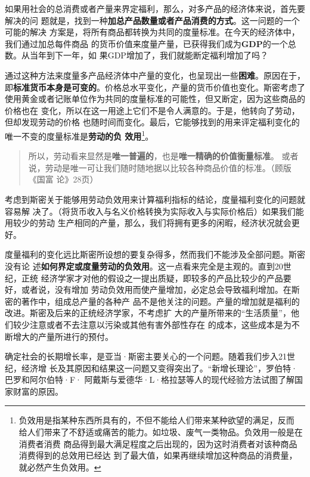 如果用社会的总消费或者产量来界定福利，那么，对多产品的经济体来说，首先要解决的问
题就是，找到一种\textbf{加总产品数量或者产品消费的方式}。这一问题的一个可能的解决
方案是，将所有商品都转换为共同的度量标准。在今天的经济体中，我们通过加总每件商品
的货币价值来度量产量，已获得我们成为\textbf{GDP}的一个总数。从当年到下一年，如
果GDP增加了，我们就能断定福利增加了吗？

通过这种方法来度量多产品经济体中产量的变化，也呈现出一些\textbf{困难}。原因在于，
即\textbf{标准货币本身是可变的}。价格总水平变化，产量的货币价值也变化。斯密考虑了
使用黄金或者记账单位作为共同的度量标准的可能性，但又断定，因为这些商品的价格也在
变化，所以在这一用途上它们不是令人满意的。于是，他转向了劳动，但却发现劳动的价格
也随时间而变化。最后，它能够找到的用来评定福利变化的唯一不变的度量标准是\textbf{劳动的负
效用}\footnote{负效用是指某种东西所具有的，不但不能给人们带来某种欲望的满足，反而
  给人们带来了不舒适或痛苦的能力。如垃圾、废气一类物品。负效用一般是在消费者消费
  商品得到最大满足程度之后出现的，因为这时消费者对该种商品消费得到的总效用已经达
  到了最大值，如果再继续增加这种商品的消费量，就必然产生负效用。}。

\begin{quotation}
  所以，劳动看来显然是\textbf{唯一普遍的}，也是\textbf{唯一精确的价值衡量标准}。
  或者说，劳动是唯一可让我们随时随地据以比较各种商品价值的标准。（顾版《国富
  论》28页）
\end{quotation}

 考虑到斯密关于能够用劳动负效用来计算福利指标的结论，度量福利变化的问题就容易解
 决了。（将货币收入与名义价格转换为实际收入与实际价格后）如果我们能用较少的劳动
 生产相同的产量，那么，我们将拥有更多的闲暇，经济状况就会更好。

 度量福利的变化远比斯密所设想的要复杂得多，然而我们不能涉及全部问题。斯密没有论
 述\textbf{如何界定或度量劳动的负效用}。这一点看来完全是主观的。直到20世纪，正统
 经济学家才对他的假设之一提出质疑，即较多的产品比较少的产品要好，或者说，没有增加
 劳动负效用而使产量增加，必定总会导致福利增加。在斯密的著作中，组成总产量的各种产
 品不是他关注的问题。产量的增加就是福利的改进。斯密及后来的正统经济学家，不考虑扩
 大的产量所带来的“生活质量”，他们较少注意或者不去注意以污染或其他有害外部性存在
 的成本，这些成本是为不断增大的产量所进行的预付。

 确定社会的长期增长率，是亚当·斯密主要关心的一个问题。随着我们步入21世纪，经济增
 长及其原因和结果这一问题又变得突出了。“新增长理论”，罗伯特·巴罗和阿尔伯特·F·
 阿戴斯与爱德华·L·格拉瑟等人的现代经验方法试图了解国家财富的原因。


